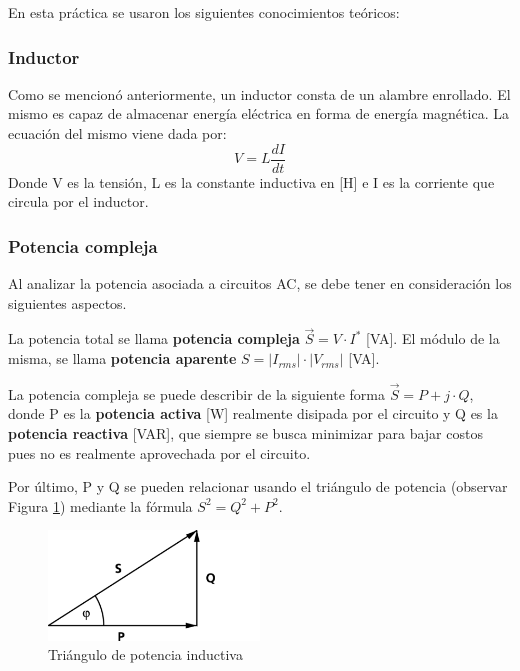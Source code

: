 \documentclass{article}
\begin{document}
        En esta práctica se usaron los siguientes conocimientos teóricos:

        \subsubsection{Inductor}

        Como se mencionó anteriormente, un inductor consta de un alambre enrollado. El mismo es capaz de almacenar energía eléctrica en forma de energía magnética.
         La ecuación del mismo viene dada por:
        \begin{equation*}
            V=L \frac{dI}{dt}
        \end{equation*}
        Donde V es la tensión, L es la constante inductiva en [H] e I es la corriente que circula por el inductor.

        \subsubsection{Potencia compleja}

        Al analizar la potencia asociada a circuitos AC, se debe tener en consideración los siguientes aspectos.\par
        La potencia total se llama { \bfseries potencia compleja} $\vec{S}= V \cdot I^{*}$ [VA]. El módulo de la misma, se llama {\bfseries potencia aparente} $S=|I_{rms}| \cdot |V_{rms}|$ 
        [VA]. \par
        La potencia compleja se puede describir de la siguiente forma $\vec{S}=P + j \cdot Q$, donde P es la { \bfseries 
        potencia activa} [W] realmente disipada por el circuito y Q es la {\bfseries potencia reactiva} [VAR], que siempre se busca minimizar para 
        bajar costos pues no es realmente aprovechada por el circuito. \par
        Por último, P y Q se pueden relacionar usando el triángulo de potencia (observar Figura \ref{fig:triangulo_de_potencia}) mediante la fórmula $S^2=Q^2+P^2$. 



        \begin{figure}[h!] %
            \centering
            \includegraphics[width=0.5\textwidth]{Trojkat-mocy.png} %
            \caption{Triángulo de potencia inductiva}
            \label{fig:triangulo_de_potencia} %
        \end{figure}
    
\end{document}
